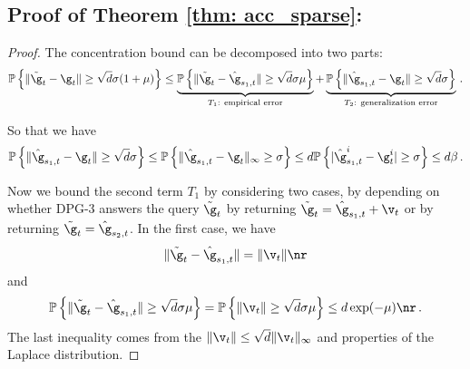 \subsection{Proof of Theorem \ref{thm: acc_sparse}:}

\theoaccsparse*

\begin{proof}
The concentration bound can be decomposed into two parts:
\begin{align}\notag
\mathbb{P}\left\{ \|\tilde \g_t - \g_t\| \geq \sqrt{d}\sigma(1+\mu)\right\}  \leq \underbrace{ \mathbb{P}\left\{ \|\tilde \g_t - \hat \g_{s_1,t}\| \geq \sqrt{d}\sigma \mu\right\} }_{\text{$T_1$: empirical error}} +  \underbrace{\mathbb{P}\left\{ \|\hat \g_{s_1,t} - \g_t\| \geq \sqrt{d}\sigma \right\}}_{\text{$T_2$: generalization error}} \, .
\end{align}

So that we have 
\begin{align} \label{eq: gen2}
    \mathbb{P}\left\{ \|\hat \g_{s_1,t} - \g_t\| \geq  \sqrt{d}\sigma \right\} \leq \mathbb{P}\left\{ \|\hat \g_{s_1,t} - \g_t\|_\infty \geq  \sigma \right\} \leq d \mathbb{P}\left\{ |\hat \g_{s_1,t}^i - \g_t^i| \geq  \sigma \right\} \leq d\beta  \, .
\end{align}

Now we bound the second term $T_1$ by considering two cases, by depending on whether DPG-3 answers the query $\tilde \g_t$ by 
returning $\tilde \g_t = \hat \g_{s_1,t} + \v_t$ or by returning $\tilde \g_t = \hat \g_{s_2,t}$. In the first case, we have 
\begin{equation}
    \|\tilde \g_t - \hat \g_{s_1,t}\| = \|\v_t\| \nr
\end{equation}
and
\begin{equation}
\begin{split}
    \mathbb{P}\left\{ \|\tilde \g_t - \hat \g_{s_1,t}\| \geq \sqrt{d}\sigma \mu  \right\}  = \mathbb{P} \left\{ \|\v_t\| \geq  \sqrt{d}\sigma \mu \right\} \leq d \exp(-\mu) \nr \, .
\end{split}
\end{equation}
The last inequality comes from the $\|\v_t\| \leq \sqrt{d}\|\v_t\|_\infty$ and properties of the Laplace distribution. 


\end{proof}
